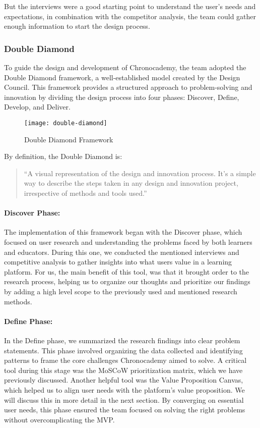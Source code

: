But the interviews were a good starting point to understand the user's needs and expectations, in combination with the competitor analysis, the team could gather enough information to start the design process.

\subsubsection{Double Diamond}\label{subsubsec:double-diamond}
To guide the design and development of Chronocademy, the team adopted the Double Diamond framework, a well-established model created by the Design Council.
This framework provides a structured approach to problem-solving and innovation by dividing the design process into four phases: Discover, Define, Develop, and Deliver.

\begin{figure}[h]
    \centering
    \texttt{[image: double-diamond]}
    \caption{Double Diamond Framework}
    \label{fig:figure12}
\end{figure}
By definition, the Double Diamond is:
\begin{quote}
    ``A visual representation of the design and innovation process.
    It’s a simple way to describe the steps taken in any design and innovation project, irrespective of methods and tools used.''~\cite[Double Diamond]{doubleDiamond}
\end{quote}

\paragraph{Discover Phase:}
The implementation of this framework began with the Discover phase, which focused on user research and understanding the problems faced by both learners and educators.
During this one, we conducted the mentioned interviews and competitive analysis to gather insights into what users value in a learning platform.
For us, the main benefit of this tool, was that it brought order to the research process, helping us to organize our thoughts and prioritize our findings by adding a high level scope to the previously used and mentioned research methods.\newline

\paragraph{Define Phase:}
In the Define phase, we summarized the research findings into clear problem statements.
This phase involved organizing the data collected and identifying patterns to frame the core challenges Chronocademy aimed to solve.
A critical tool during this stage was the MoSCoW prioritization matrix, which we have previously discussed.
Another helpful tool was the Value Proposition Canvas, which helped us to align user needs with the platform's value proposition.
We will discuss this in more detail in the next section.
By converging on essential user needs, this phase ensured the team focused on solving the right problems without overcomplicating the MVP\@.\newline

